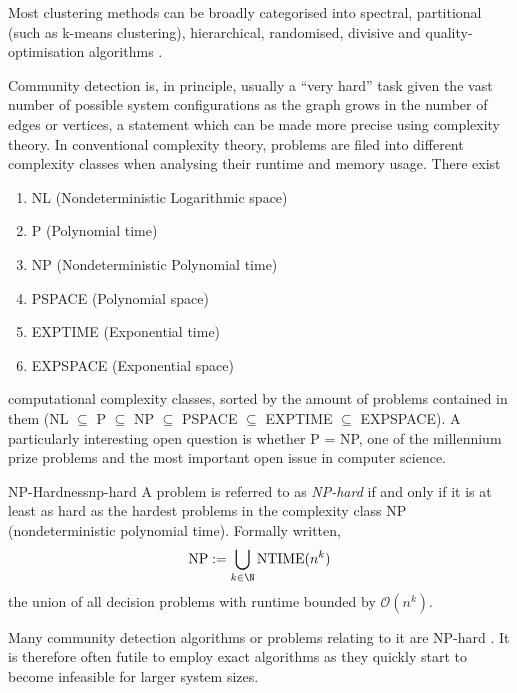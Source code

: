 \documentclass[12pt, a4paper]{article}
\begin{document}
  Most clustering methods can be broadly categorised into spectral, partitional (such as k-means clustering), hierarchical, randomised, divisive and quality-optimisation algorithms \parencite{fortunato}.

  Community detection is, in principle, usually a ``very hard'' task given the vast number of possible system configurations as the graph grows in the number of edges or vertices, a statement which can be made more precise using complexity theory.
  In conventional complexity theory, problems are filed into different complexity classes when analysing their runtime and memory usage.
  There exist
  \begin{enumerate}[noitemsep,topsep=0pt,parsep=0pt,partopsep=0pt]
    \item NL (Nondeterministic Logarithmic space)
    \item P (Polynomial time)
    \item NP (Nondeterministic Polynomial time)
    \item PSPACE (Polynomial space)
    \item EXPTIME (Exponential time)
    \item EXPSPACE (Exponential space)
  \end{enumerate}
  computational complexity classes, sorted by the amount of problems contained in them (NL $\subseteq$ P $\subseteq$ NP $\subseteq$ PSPACE $\subseteq$ EXPTIME $\subseteq$ EXPSPACE).
  A particularly interesting open question is whether P = NP, one of the millennium prize problems and the most important open issue in computer science.

  \begin{definition}{NP-Hardness}{np-hard}
    A problem is referred to as \textit{NP-hard} if and only if it is at least as hard as the hardest problems in the complexity class NP (nondeterministic polynomial time). Formally written,
    $$\mathrm{NP} := \bigcup_{k \in \N} \mathrm{NTIME}(n^k)$$
    the union of all decision problems with runtime bounded by $\mathcal{O}(n^k)$.
  \end{definition}

  Many community detection algorithms or problems relating to it are NP-hard \parencite{fortunato}.
  It is therefore often futile to employ exact algorithms as they quickly start to become infeasible for larger system sizes.
\end{document}
